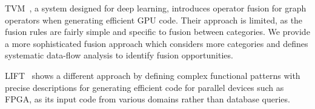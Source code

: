 

TVM~\cite{Chen18:TVM}, a system designed for deep learning, introduces
operator fusion for graph operators when generating efficient GPU code.
Their approach is limited, as the fusion rules are fairly simple and
specific to fusion between categories.
We provide a more sophisticated fusion approach which considers more categories
and defines systematic data-flow analysis to identify fusion opportunities.

LIFT~\cite{Kristien19:LiftPatterns} shows a different approach by defining
complex functional patterns with precise descriptions for generating efficient
code for parallel devices such as FPGA, as its input code from various domains
rather than database queries.



